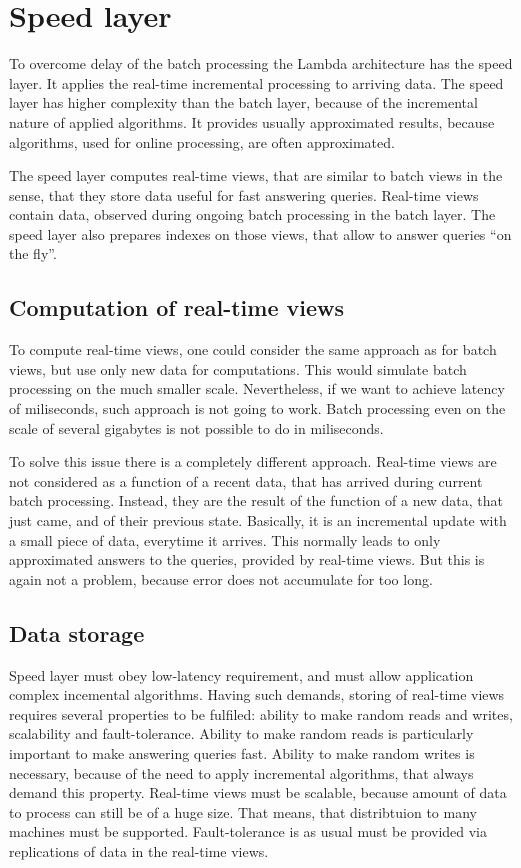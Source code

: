 \section{Speed layer}
\label{sec:speed_layer}

To overcome delay of the batch processing the Lambda architecture has the speed layer.
It applies the real-time incremental processing to arriving data.
The speed layer has higher complexity than the batch layer, because of the incremental nature of applied algorithms.
It provides usually approximated results, because algorithms, used for online processing, are often approximated.

The speed layer computes real-time views, that are similar to batch views in the sense, that they store data useful for fast answering queries.
Real-time views contain data, observed during ongoing batch processing in the batch layer.
The speed layer also prepares indexes on those views, that allow to answer queries ``on the fly''.

\subsection{Computation of real-time views}

To compute real-time views, one could consider the same approach as for batch views, but use only new data for computations.
This would simulate batch processing on the much smaller scale.
Nevertheless, if we want to achieve latency of miliseconds, such approach is not going to work.
Batch processing even on the scale of several gigabytes is not possible to do in miliseconds.

To solve this issue there is a completely different approach.
Real-time views are not considered as a function of a recent data, that has arrived during current batch processing.
Instead, they are the result of the function of a new data, that just came, and of their previous state.
Basically, it is an incremental update with a small piece of data, everytime it arrives.
This normally leads to only approximated answers to the queries, provided by real-time views.
But this is again not a problem, because error does not accumulate for too long.

\subsection{Data storage}

Speed layer must obey low-latency requirement, and must allow application complex incemental algorithms.
Having such demands, storing of real-time views requires several properties to be fulfiled: ability to make random reads and writes, scalability and fault-tolerance.
Ability to make random reads is particularly important to make answering queries fast.
Ability to make random writes is necessary, because of the need to apply incremental algorithms, that always demand this property.
Real-time views must be scalable, because amount of data to process can still be of a huge size.
That means, that distribtuion to many machines must be supported.
Fault-tolerance is as usual must be provided via replications of data in the real-time views.

